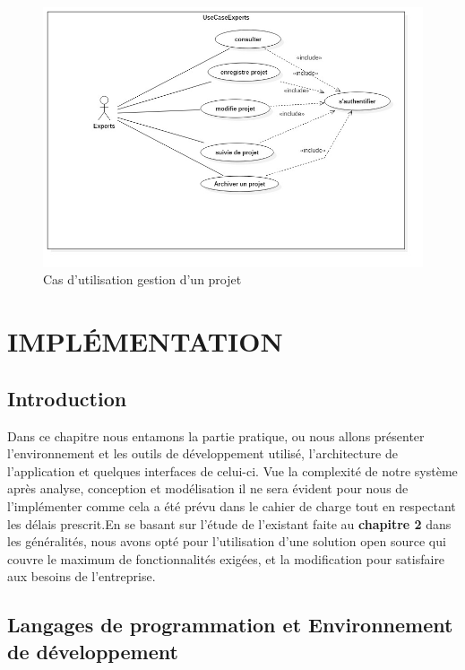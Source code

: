 \documentclass[14pt,A4,french,oneside,leqno]{report}
\begin{document}
\begin{figure}[h]
	\centering
	\includegraphics[width=0.6\linewidth]{UseCaseDiagram2}
	\caption{Cas d'utilisation gestion d'un projet}
	\label{fig:usecasediagram2}
\end{figure}




\chapter{IMPLÉMENTATION}
\section{Introduction}
 Dans ce chapitre nous entamons la partie pratique, ou nous allons présenter l’environnement et les outils de développement utilisé, l’architecture de l’application et quelques interfaces de celui-ci. Vue la complexité de notre système après analyse, conception et modélisation il ne sera évident pour nous de l'implémenter comme cela a été prévu dans le cahier de charge tout en respectant les délais prescrit.En se basant sur l'étude de l'existant faite au \textbf{chapitre 2} dans les généralités, nous avons opté pour l'utilisation d'une solution open source qui couvre le maximum de fonctionnalités exigées, et la modification pour satisfaire aux besoins de l'entreprise.
\section{Langages de programmation et Environnement de développement}
\end{document}
